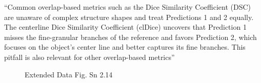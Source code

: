\documentclass[11pt]{article}
\begin{document}
``Common overlap-based metrics such as the Dice Similarity Coefficient (DSC) are unaware of complex structure shapes and treat Predictions 1 and 2 equally. The centerline Dice Similarity Coefficient (clDice) uncovers that Prediction 1 misses the fine-granular branches of the reference and favors Prediction 2, which focuses on the object’s center line and better captures its fine branches. This pitfall is also relevant for other overlap-based metrics''~\cite{pitfalls-in-segmentation-evaluation}

\begin{figure}[H]
    \centering
    \caption{Extended Data Fig. Sn 2.14~\cite{pitfalls-in-segmentation-evaluation}}
\end{figure}

\begin{figure}[H]
    \centering
\end{figure}
\end{document}
